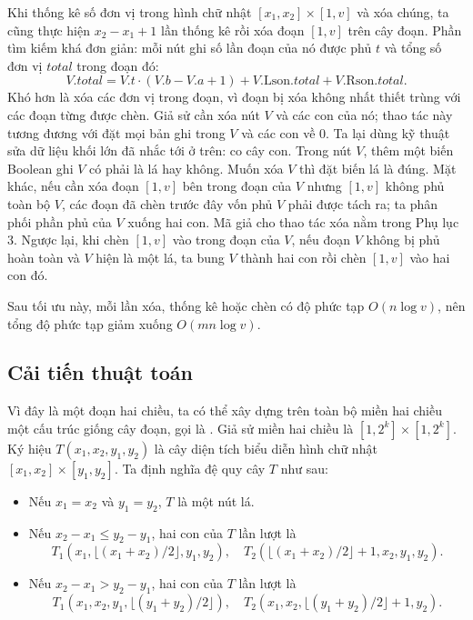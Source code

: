 \documentclass[11pt]{article}
\begin{document}
Khi thống kê số đơn vị trong hình chữ nhật $[x_1,x_2]\times[1,v]$ và xóa
chúng, ta cũng thực hiện $x_2-x_1+1$ lần thống kê rồi xóa đoạn $[1,v]$ trên
cây đoạn. Phần tìm kiếm khá đơn giản: mỗi nút ghi số lần đoạn của nó được phủ
$t$ và tổng số đơn vị $\mathit{total}$ trong đoạn đó:
\[
  V.\mathit{total}
  =V.t\cdot(V.b-V.a+1)+V.\mathrm{Lson}.\mathit{total}
   +V.\mathrm{Rson}.\mathit{total}.
\]
Khó hơn là xóa các đơn vị trong đoạn, vì đoạn bị xóa không nhất thiết trùng
với các đoạn từng được chèn. Giả sử cần xóa nút $V$ và các con của nó; thao
tác này tương đương với đặt mọi bản ghi trong $V$ và các con về $0$. Ta lại
dùng kỹ thuật sửa dữ liệu khối lớn đã nhắc tới ở trên: co cây con. Trong nút
$V$, thêm một biến Boolean ghi $V$ có phải là lá hay không. Muốn xóa $V$ thì
đặt biến lá là đúng. Mặt khác, nếu cần xóa đoạn $[1,v]$ bên trong đoạn của
$V$ nhưng $[1,v]$ không phủ toàn bộ $V$, các đoạn đã chèn trước đây vốn phủ
$V$ phải được tách ra; ta phân phối phần phủ của $V$ xuống hai con. Mã giả
cho thao tác xóa nằm trong Phụ lục 3. Ngược lại, khi chèn $[1,v]$ vào trong
đoạn của $V$, nếu đoạn $V$ không bị phủ hoàn toàn và $V$ hiện là một lá, ta
bung $V$ thành hai con rồi chèn $[1,v]$ vào hai con đó.

Sau tối ưu này, mỗi lần xóa, thống kê hoặc chèn có độ phức tạp
$O(n\log v)$, nên tổng độ phức tạp giảm xuống $O(mn\log v)$.

\subsection*{Cải tiến thuật toán}

Vì đây là một đoạn hai chiều, ta có thể xây dựng trên toàn bộ miền hai chiều
một cấu trúc giống cây đoạn, gọi là . Giả sử miền hai
chiều là $[1,2^k]\times[1,2^k]$. Ký hiệu
$T(x_1,x_2,y_1,y_2)$ là cây diện tích biểu diễn hình chữ nhật
$[x_1,x_2]\times[y_1,y_2]$. Ta định nghĩa đệ quy cây $T$ như sau:
\begin{itemize}
  \item Nếu $x_1=x_2$ và $y_1=y_2$, $T$ là một nút lá.
  \item Nếu $x_2-x_1\le y_2-y_1$, hai con của $T$ lần lượt là
  \[
    T_1(x_1,\lfloor(x_1+x_2)/2\rfloor,y_1,y_2),\quad
    T_2(\lfloor(x_1+x_2)/2\rfloor+1,x_2,y_1,y_2).
  \]
  \item Nếu $x_2-x_1>y_2-y_1$, hai con của $T$ lần lượt là
  \[
    T_1(x_1,x_2,y_1,\lfloor(y_1+y_2)/2\rfloor),\quad
    T_2(x_1,x_2,\lfloor(y_1+y_2)/2\rfloor+1,y_2).
  \]
\end{itemize}
\end{document}
